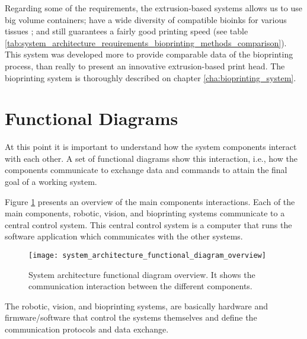 Regarding some of the requirements, the extrusion-based systems allows us to use big volume containers; have a wide diversity of compatible bioinks for various tissues  \cite{Hospodiuk2017_bioink_comprehensive_review_bioprintable_materials}; and still guarantees a fairly good printing speed (see table \ref{tab:system_architecture_requirements_bioprinting_methods_comparison}).\\

This system was developed more to provide comparable data of the bioprinting process, than really to present an innovative extrusion-based print head. The bioprinting system is thoroughly described on chapter \ref{cha:bioprinting_system}.




\section{Functional Diagrams}
\label{sec:system_architecture_functional_diagrams}

At this point it is important to understand how the system components interact with each other. A set of functional diagrams show this interaction, i.e., how the components communicate to exchange data and commands to attain the final goal of a working system.

Figure \ref{fig:system_architecture_functional_diagram_overview} presents an overview of the main components interactions. Each of the main components, robotic, vision, and bioprinting systems communicate to a central control system. This central control system is a computer that runs the software application which communicates with the other systems.

\begin{figure}[htbp]
	\centering
	\texttt{[image: system\_architecture\_functional\_diagram\_overview]}
	\caption{System architecture functional diagram overview. It shows the communication interaction between the different components.}
	\label{fig:system_architecture_functional_diagram_overview}
\end{figure}

The robotic, vision, and bioprinting systems, are basically hardware and firmware/software that control the systems themselves and define the communication protocols and data exchange.\\

